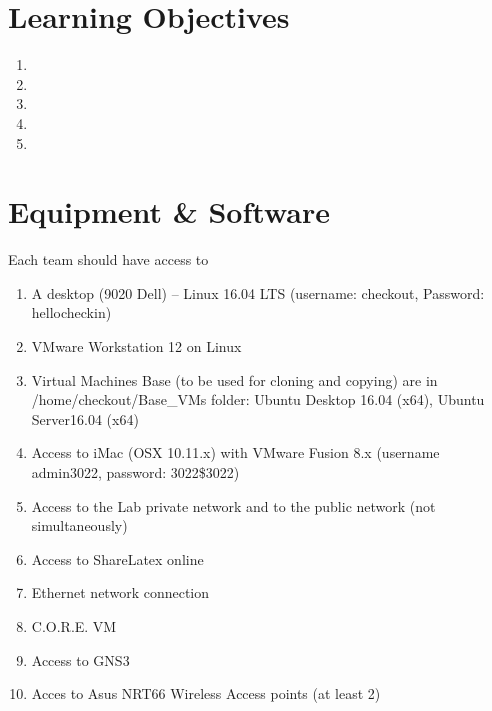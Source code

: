 \documentclass[main.tex]{subfiles}
\begin{document}
\section{Learning Objectives}\label{sec 1}
\begin{enumerate}[noitemsep,label=$\bullet$,leftmargin=16mm,labelsep=0.5cm]
\item 
\item 
\item 
\item 
\item 

\end{enumerate}

\section{Equipment \& Software}\label{sec2}
Each team should have access to 
\begin{enumerate}[noitemsep,label=$\bullet$,leftmargin=16mm,labelsep=0.5cm]
\item{A desktop (9020 Dell) – Linux 16.04 LTS (username: checkout, Password: hellocheckin)}
\item{VMware Workstation 12 on Linux}
\item{Virtual Machines Base (to be used for cloning and copying) are in /home/checkout/Base\_VMs folder:
Ubuntu Desktop 16.04 (x64), Ubuntu Server16.04 (x64)}
\item{Access to iMac (OSX 10.11.x) with VMware Fusion 8.x (username admin3022, password: 3022\$3022)}
\item{Access to the Lab private network and to the public network (not simultaneously)}
\item{Access to ShareLatex online}
\item{Ethernet network connection} 
\item C.O.R.E. VM
\item Access to GNS3
\item Acces to Asus NRT66 Wireless Access points (at least 2)
\end{enumerate}
\end{document}
